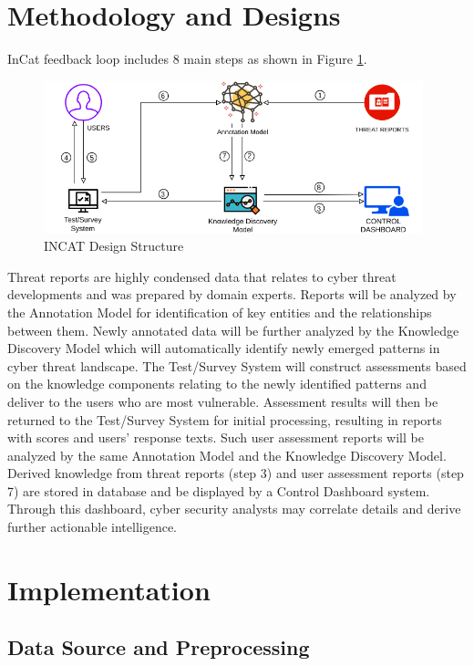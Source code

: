 \documentclass{article} %
\begin{document}
\section{Methodology and Designs}
InCat feedback loop includes 8 main steps as shown in Figure \ref{Figure:IncatDesign}. 

\begin{figure}[h]
  \centering
  \includegraphics[width=11cm]{images/INCAT-Designs.png}
  \caption{INCAT Design Structure}
  \label{Figure:IncatDesign}
\end{figure}

Threat reports are highly condensed data that relates to cyber threat developments and was prepared by domain experts. Reports will be analyzed by the Annotation Model for identification of key entities and the relationships between them. Newly annotated data will be further analyzed by the Knowledge Discovery Model which will automatically identify newly emerged patterns in cyber threat landscape. The Test/Survey System will construct assessments based on the knowledge components relating to the newly identified patterns and deliver to the users who are most vulnerable. Assessment results will then be returned to the Test/Survey System for initial processing, resulting in reports with scores and users' response texts. Such user assessment reports will be analyzed by the same Annotation Model and the Knowledge Discovery Model. Derived knowledge from threat reports (step 3) and user assessment reports (step 7) are stored in database and be displayed by a Control Dashboard system. Through this dashboard, cyber security analysts may correlate details and derive further actionable intelligence.

\section{Implementation}
\subsection{Data Source and Preprocessing}
\end{document}
